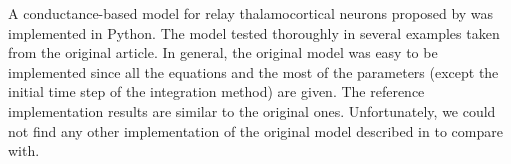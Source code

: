 \documentclass[10pt,a4paper,onecolumn]{article}
\begin{document}
A conductance-based model for relay thalamocortical neurons proposed 
by \cite{wang:1994} was implemented in Python. The model tested 
thoroughly in several examples taken from the original article. 
In general, the original model was easy to be implemented since all the
equations and the most of the parameters (except the initial time step of the
integration method) are given. The reference implementation results are similar
to the original ones. Unfortunately, we could not find any other implementation
of the original model described in \cite{wang:1994} to compare with. 

{\sffamily \small
  \printbibliography[title=References]
}
\end{document}
